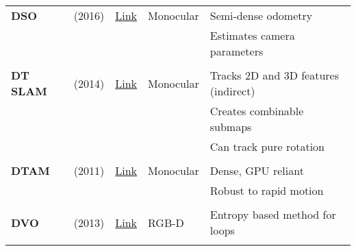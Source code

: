 \documentclass[a4paper,12pt]{scrartcl}
\begin{document}
{\begin{longtable}{l|l|l|l|l}
    \textbf{DSO}           & \cite{Engel2016} (2016)           & {\href{https://github.com/JakobEngel/dso}{Link}}                   & Monocular             & Semi-dense odometry\\
                           &                                   &                                                                    &                       & Estimates camera parameters\\
                           &                                   &                                                                    &                       &\\
    \textbf{DT SLAM}       & \cite{Daniel2014} (2014)          & {\href{https://github.com/plumonito/dtslam}{Link}}                 & Monocular             & Tracks 2D and 3D features (indirect)\\
                           &                                   &                                                                    &                       & Creates combinable submaps\\
                           &                                   &                                                                    &                       & Can track pure rotation\\
                           &                                   &                                                                    &                       &\\
    \textbf{DTAM}          & \cite{Newcombe2011} (2011)        & {\href{https://github.com/anuranbaka/OpenDTAM}{Link}}              & Monocular             & Dense, GPU reliant\\
                           &                                   &                                                                    &                       & Robust to rapid motion\\
                           &                                   &                                                                    &                       &\\
    \textbf{DVO}           & \cite{Kerl2013} (2013)            & {\href{https://github.com/tum-vision/dvo_slam}{Link}}              & RGB-D                 & Entropy based method for loops\\
                           &                                   &                                                                    &                       &\\

\end{longtable}}
\end{document}
